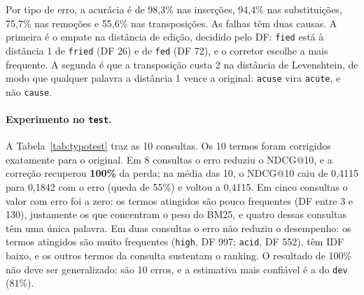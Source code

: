\documentclass[11pt,a4paper]{article}
\newcommand{\cod}[1]{\texttt{#1}}
\begin{document}
Por tipo de erro, a acurácia é de 98,3\% nas inserções, 94,4\% nas substituições, 75,7\% nas remoções e 55,6\% nas transposições. As falhas têm duas causas. A primeira é o empate na distância de edição, decidido pelo DF: \cod{fied} está à distância 1 de \cod{fried} (DF 26) e de \cod{fed} (DF 72), e o corretor escolhe a mais frequente. A segunda é que a transposição custa 2 na distância de Levenshtein, de modo que qualquer palavra a distância 1 vence a original: \cod{acuse} vira \cod{acute}, e não \cod{cause}.

\paragraph{Experimento no \cod{test}.} A Tabela~\ref{tab:typotest} traz as 10 consultas. Os 10 termos foram corrigidos exatamente para o original. Em 8 consultas o erro reduziu o NDCG@10, e a correção recuperou \textbf{100\%} da perda; na média das 10, o NDCG@10 caiu de 0,4115 para 0,1842 com o erro (queda de 55\%) e voltou a 0,4115. Em cinco consultas o valor com erro foi a zero: os termos atingidos são pouco frequentes (DF entre 3 e 130), justamente os que concentram o peso do BM25, e quatro dessas consultas têm uma única palavra. Em duas consultas o erro não reduziu o desempenho: os termos atingidos são muito frequentes (\cod{high}, DF 997; \cod{acid}, DF 552), têm IDF baixo, e os outros termos da consulta sustentam o ranking. O resultado de 100\% não deve ser generalizado: são 10 erros, e a estimativa mais confiável é a do \cod{dev} (81\%).
\end{document}
